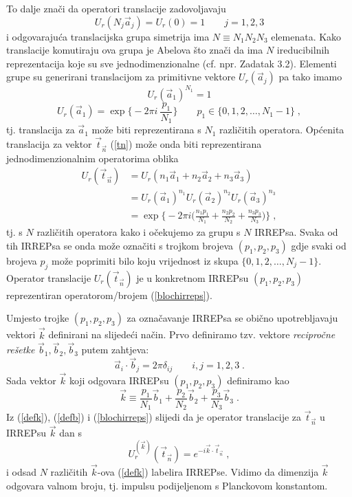 To dalje znači da operatori translacije zadovoljavaju
\begin{equation}
       U_{r}(N_j \vec{a}_j) = U_{r}(0) = 1 \qquad  j=1,2,3
\end{equation}
i odgovarajuća translacijska grupa simetrija ima $N\equiv N_1 N_2 N_3$
elemenata. Kako translacije komutiraju ova grupa je Abelova što
znači da ima $N$ ireducibilnih reprezentacija koje su
sve jednodimenzionalne (cf. npr. Zadatak 3.2).
Elementi grupe su generirani translacijom za primitivne vektore
$U_{r}(\vec{a}_j)$  pa tako imamo
\begin{equation}
U_{r}(\vec{a}_1)^{N_1} = 1 
\end{equation}
\begin{equation}
U_{r}(\vec{a}_1) = \exp\Big\{-2\pi i\: \frac{p_1 }{N_1}\Big\} \qquad 
 p_1 \in \{0,1,2,\ldots ,N_1 -1\} \;,
\end{equation}
tj. translacija za $\vec{a}_1$ može biti reprezentirana s
$N_1$ različitih operatora.  Općenita translacija za vektor 
$\vec{t}_{\vec{n}}$ (\ref{tn}) može onda biti reprezentirana jednodimenzionalnim
operatorima oblika
\begin{align}
 U_{r}(\vec{t}_{\vec{n}}) &=
 U_{r}(n_1 \vec{a}_1 + n_2 \vec{a}_2 + n_3  \vec{a}_3) \\
 &= U_{r}(\vec{a}_1)^{n_1} U_{r}(\vec{a}_2)^{n_2} U_{r}(\vec{a}_3)^{n_3} \\
 &= \exp\Big\{ -2\pi i \Big( \frac{n_1 p_1}{N_1} + \frac{n_2 p_2}{N_2} 
 + \frac{n_3 p_3}{N_3} \Big)\Big\} \;,
\label{blochirreps}
\end{align}
tj. s $N$ različitih operatora kako i očekujemo za grupu s $N$ IRREPsa.
Svaka od tih IRREPsa se onda može označiti s trojkom brojeva $(p_1, p_2, p_3)$
gdje svaki od brojeva $p_j$ može poprimiti bilo koju vrijednost iz
skupa $\{0, 1, 2, \ldots ,N_j -1\}$.
Operator translacije $U_{r}(\vec{t}_{\vec{n}})$ je u konkretnom IRREPsu 
 $(p_1, p_2, p_3)$ reprezentiran operatorom/brojem (\ref{blochirreps}).

Umjesto trojke $(p_1, p_2, p_3)$ za označavanje IRREPsa se obično
upotrebljavaju vektori $\vec{k}$ definirani na slijedeći način. Prvo
definiramo tzv. vektore \emph{recipročne rešetke} $\vec{b}_1, \vec{b}_2,
\vec{b}_3$ putem zahtjeva:
\begin{equation}
   \vec{a}_i\cdot \vec{b}_j = 2 \pi \delta_{ij} \qquad i,j = 1, 2, 3 \;.
\label{defb}
\end{equation}
Sada vektor $\vec{k}$ koji odgovara IRREPsu
$(p_1, p_2, p_3)$ definiramo kao
\begin{equation}
  \vec{k} \equiv \frac{p_1}{N_1}\vec{b}_1 + \frac{p_2}{N_2}\vec{b}_2 + 
  \frac{p_3}{N_3}\vec{b}_3 \;.
\label{defk}
\end{equation}
Iz (\ref{defk}), (\ref{defb}) i (\ref{blochirreps}) slijedi da je
operator translacije za $\vec{t}_{\vec{n}}$ u IRREPsu $\vec{k}$
dan s
\begin{equation}
 U_{r}^{(\vec{k})} (\vec{t}_{\vec{n}}) = 
 e^{-i \vec{k}\cdot \vec{t}_{\vec{n}}} \;,
\end{equation}
i odsad $N$ različitih $\vec{k}$-ova (\ref{defk}) labelira IRREPse.
Vidimo da dimenzija $\vec{k}$ odgovara valnom broju, tj. impulsu
podijeljenom s Planckovom konstantom.


